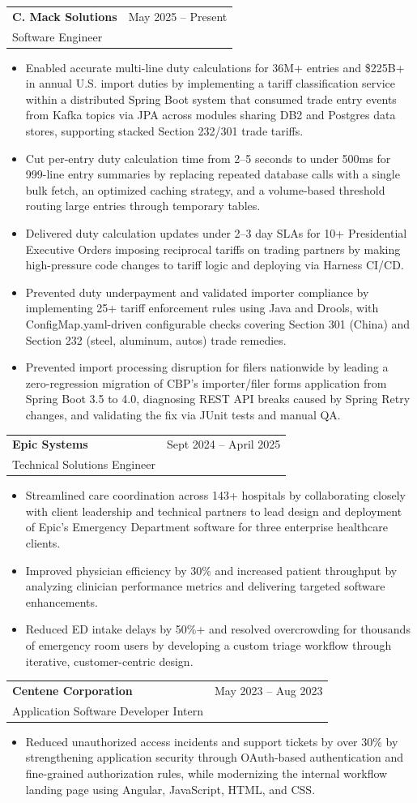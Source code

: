 \documentclass[letterpaper,11pt]{article}
\makeatletter
\newcommand{\resumeItem}[1]{
  \item\small{
    {#1 \vspace{-2pt}}
  }
}
\newcommand{\resumeSubheading}[4]{
  \vspace{-1pt}\item
    \begin{tabular*}{0.97\textwidth}[t]{l@{\extracolsep{\fill}}r}
      \textbf{#1} & #2 \\
      #3 & \textit{\small #4} \\
    \end{tabular*}\vspace{-5pt}
}
\newcommand{\resumeItemListStart}{\begin{itemize}[itemsep=-1pt]}
\newcommand{\resumeItemListEnd}{\end{itemize}\vspace{-4pt}}
\makeatother
\begin{document}
    \resumeSubheading
      {C. Mack Solutions}{May 2025 -- Present}
      {Software Engineer}{}
      \resumeItemListStart
        \resumeItem{Enabled accurate multi-line duty calculations for 36M+ entries and \$225B+ in annual U.S. import duties by implementing a tariff classification service within a distributed Spring Boot system that consumed trade entry events from Kafka topics via JPA across modules sharing DB2 and Postgres data stores, supporting stacked Section 232/301 trade tariffs.}
        \resumeItem{Cut per-entry duty calculation time from 2--5 seconds to under 500ms for 999-line entry summaries by replacing repeated database calls with a single bulk fetch, an optimized caching strategy, and a volume-based threshold routing large entries through temporary tables.}
        \resumeItem{Delivered duty calculation updates under 2--3 day SLAs for 10+ Presidential Executive Orders imposing reciprocal tariffs on trading partners by making high-pressure code changes to tariff logic and deploying via Harness CI/CD.}
        \resumeItem{Prevented duty underpayment and validated importer compliance by implementing 25+ tariff enforcement rules using Java and Drools, with ConfigMap.yaml-driven configurable checks covering Section 301 (China) and Section 232 (steel, aluminum, autos) trade remedies.}
        \resumeItem{Prevented import processing disruption for filers nationwide by leading a zero-regression migration of CBP's importer/filer forms application from Spring Boot 3.5 to 4.0, diagnosing REST API breaks caused by Spring Retry changes, and validating the fix via JUnit tests and manual QA.}
      \resumeItemListEnd

    \resumeSubheading
      {Epic Systems}{Sept 2024 -- April 2025}
      {Technical Solutions Engineer}{}
      \resumeItemListStart
        \resumeItem{Streamlined care coordination across 143+ hospitals by collaborating closely with client leadership and technical partners to lead design and deployment of Epic's Emergency Department software for three enterprise healthcare clients.}
        \resumeItem{Improved physician efficiency by 30\% and increased patient throughput by analyzing clinician performance metrics and delivering targeted software enhancements.}
        \resumeItem{Reduced ED intake delays by 50\%+ and resolved overcrowding for thousands of emergency room users by developing a custom triage workflow through iterative, customer-centric design.}
      \resumeItemListEnd

    \resumeSubheading
      {Centene Corporation}{May 2023 -- Aug 2023}
      {Application Software Developer Intern}{}
      \resumeItemListStart
        \resumeItem{Reduced unauthorized access incidents and support tickets by over 30\% by strengthening application security through OAuth-based authentication and fine-grained authorization rules, while modernizing the internal workflow landing page using Angular, JavaScript, HTML, and CSS.}
      \resumeItemListEnd
\end{document}
